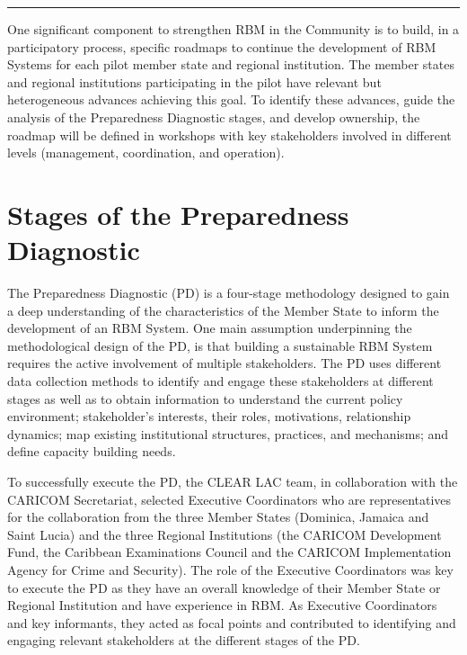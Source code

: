 \documentclass[
  10pt,
]{book}
\begin{document}
\begin{center}\rule{0.5\linewidth}{0.5pt}\end{center}

One significant component to strengthen RBM in the Community is to build, in a participatory process, specific roadmaps to continue the development of RBM Systems for each pilot member state and regional institution. The member states and regional institutions participating in the pilot have relevant but heterogeneous advances achieving this goal. To identify these advances, guide the analysis of the Preparedness Diagnostic stages, and develop ownership, the roadmap will be defined in workshops with key stakeholders involved in different levels (management, coordination, and operation).

\hypertarget{stages-of-the-preparedness-diagnostic}{%
\section{Stages of the Preparedness Diagnostic}\label{stages-of-the-preparedness-diagnostic}}

The Preparedness Diagnostic (PD) is a four-stage methodology designed to gain a deep understanding of the characteristics of the Member State to inform the development of an RBM System. One main assumption underpinning the methodological design of the PD, is that building a sustainable RBM System requires the active involvement of multiple stakeholders. The PD uses different data collection methods to identify and engage these stakeholders at different stages as well as to obtain information to understand the current policy environment; stakeholder's interests, their roles, motivations, relationship dynamics; map existing institutional structures, practices, and mechanisms; and define capacity building needs.

To successfully execute the PD, the CLEAR LAC team, in collaboration with the CARICOM Secretariat, selected Executive Coordinators who are representatives for the collaboration from the three Member States (Dominica, Jamaica and Saint Lucia) and the three Regional Institutions (the CARICOM Development Fund, the Caribbean Examinations Council and the CARICOM Implementation Agency for Crime and Security). The role of the Executive Coordinators was key to execute the PD as they have an overall knowledge of their Member State or Regional Institution and have experience in RBM. As Executive Coordinators and key informants, they acted as focal points and contributed to identifying and engaging relevant stakeholders at the different stages of the PD.
\end{document}
